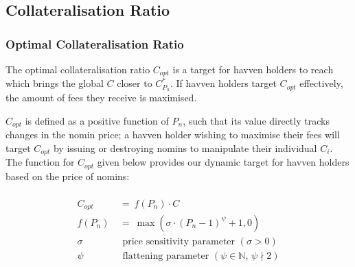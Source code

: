 \subsection{Collateralisation Ratio}
\label{subsec:collatratio}
\subsubsection{Optimal Collateralisation Ratio}

\noindent The optimal collateralisation ratio \(C_{opt}\) is a target for
havven holders to reach which brings the global \(C\) closer to \(C^*_{P_h}\).
If havven holders target \(C_{opt}\) effectively, the amount of fees they receive
is maximised.

\noindent \(C_{opt}\) is defined as a positive function of \(P_n\), such that its value
directly tracks changes in the nomin price; a havven holder wishing to
maximise their fees will target \(C_{opt}\) by issuing or destroying nomins
to manipulate their individual \(C_i\). \\

\noindent The function for \(C_{opt}\) given below provides our dynamic target
for havven holders based on the price of nomins:

\begin{gather} \label{eq:optcollateralisation}
\begin{align}
\begin{split}
C_{opt} \ &= \ f(P_{n}) \cdot C  \\ 
f(P_n) \ &= \ \max(\sigma \cdot {(P_n - 1)}^{\psi} + 1, 0) \\
\sigma \ & \text{ \ price sensitivity parameter } (\sigma > 0)\\
\psi   \ & \text{ \ flattening parameter } (\psi \in \mathbb{N} \text{, } \psi \nmid 2) \\
\end{split}
\end{align}
\end{gather}


\begin{center}
\end{center}

